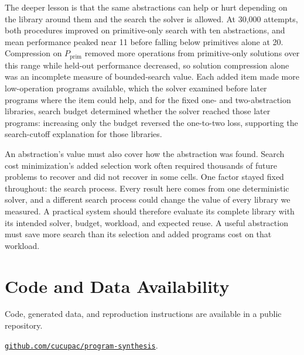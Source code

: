 \documentclass[10pt]{article}
\begin{document}
The deeper lesson is that the same abstractions can help or hurt depending
on the library around them and the search the solver is allowed. At 30,000
attempts, both procedures improved on primitive-only search with ten
abstractions, and mean performance peaked near 11 before falling below
primitives alone at 20. Compression on $P_{\mathrm{prim}}$ removed more
operations from primitive-only solutions over this range while held-out
performance decreased, so solution compression alone was an incomplete
measure of bounded-search value. Each added item made more low-operation
programs available, which the solver examined before later programs where
the item could help, and for the fixed one- and two-abstraction libraries,
search budget determined whether the solver reached those later programs:
increasing only the budget reversed the one-to-two loss, supporting the
search-cutoff explanation for those libraries.

An abstraction's value must also cover how the abstraction was found. Search
cost minimization's added selection work often required thousands of future
problems to recover and did not recover in some cells. One factor stayed
fixed throughout: the search process. Every result here comes from one
deterministic solver, and a different search process could change the value
of every library we measured. A practical system
should therefore evaluate its complete library with its intended solver,
budget, workload, and expected reuse. A useful abstraction must save more
search than its selection and added programs cost on that workload.

\section*{Code and Data Availability}

Code, generated data, and reproduction instructions are available in a public
repository.
\par\smallskip
\noindent
\href{https://github.com/cucupac/program-synthesis}{%
\mbox{\texttt{github.com/cucupac/program-synthesis}}}.

\clearpage


\end{document}
